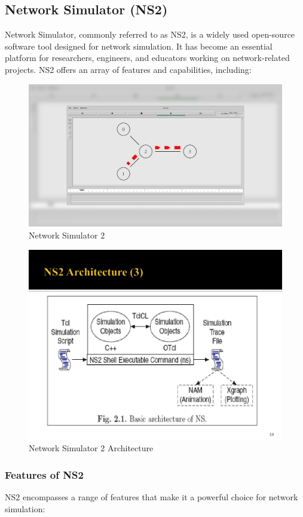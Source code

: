 \documentclass[11pt]{article}
\begin{document}
\subsection{Network Simulator (NS2)}
Network Simulator, commonly referred to as NS2, is a widely used open-source software tool designed for network simulation. It has become an essential platform for researchers, engineers, and educators working on network-related projects. NS2 offers an array of features and capabilities, including:


\begin{figure}[H]
    \centering
    \includegraphics[width=.45\textwidth]{Network Simulator 2/Network Simulator 2_1.jpg}
    \caption{Network Simulator 2}
\end{figure}

\begin{figure}[H]
    \centering
    \includegraphics[width=.65\textwidth]{NS2 Architecture/NS2 Architecture_4.jpg}
    \caption{Network Simulator 2 Architecture}
\end{figure}


\subsubsection{Features of NS2}
NS2 encompasses a range of features that make it a powerful choice for network simulation:
\end{document}
